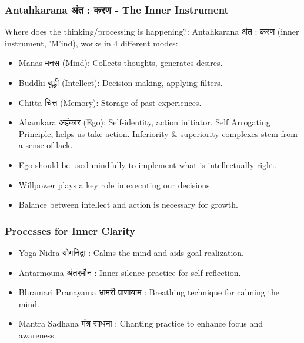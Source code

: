 \begin{frame}[fragile]\frametitle{Antahkarana अंत : करण - The Inner Instrument}

Where does the thinking/processing is happening?: Antahkarana अंत : करण (inner instrument, 'M'ind), works in 4 different modes:
      \begin{itemize}
        \item Manas मनस (Mind): Collects thoughts, generates desires.
        \item Buddhi बुद्धी (Intellect): Decision making, applying filters.
        \item Chitta चित्त (Memory): Storage of past experiences.
        \item Ahamkara अहंकार (Ego): Self-identity, action initiator. Self Arrogating Principle, helps us take action. Inferiority \& superiority complexes stem from a sense of lack. 
        \item Ego should be used mindfully to implement what is intellectually right.
        \item Willpower plays a key role in executing our decisions.
        \item Balance between intellect and action is necessary for growth.
      \end{itemize}
\end{frame}

\begin{frame}[fragile]\frametitle{Processes for Inner Clarity}
      \begin{itemize}
        \item Yoga Nidra योगनिद्रा : Calms the mind and aids goal realization.
        \item Antarmouna अंतरमौन : Inner silence practice for self-reflection.
        \item Bhramari Pranayama भ्रामरी प्राणायाम : Breathing technique for calming the mind.
        \item Mantra Sadhana मंत्र साधना : Chanting practice to enhance focus and awareness.
      \end{itemize}
\end{frame}


